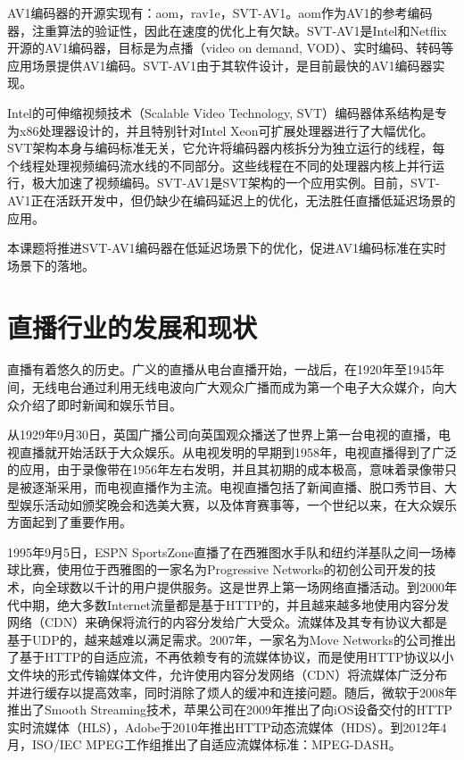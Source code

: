 AV1编码器的开源实现有：aom\cite{AV1SourceCode2020}，rav1e\cite{barbatoRustAV1Encoder2019}，SVT-AV1\cite{ScalableVideoTechnology2020}。aom作为AV1的参考编码器，注重算法的验证性，因此在速度的优化上有欠缺。SVT-AV1是Intel和Netflix开源的AV1编码器，目标是为点播（video on demand, VOD）、实时编码、转码等应用场景提供AV1编码。SVT-AV1由于其软件设计，是目前最快的AV1编码器实现。

Intel的可伸缩视频技术（Scalable Video Technology, SVT）\cite{ScalableVideoTechnology2019}编码器体系结构是专为x86处理器设计的，并且特别针对Intel Xeon可扩展处理器进行了大幅优化。SVT架构本身与编码标准无关，它允许将编码器内核拆分为独立运行的线程，每个线程处理视频编码流水线的不同部分。这些线程在不同的处理器内核上并行运行，极大加速了视频编码。SVT-AV1是SVT架构的一个应用实例。目前，SVT-AV1正在活跃开发中，但仍缺少在编码延迟上的优化，无法胜任直播低延迟场景的应用。

本课题将推进SVT-AV1编码器在低延迟场景下的优化，促进AV1编码标准在实时场景下的落地。

\section{直播行业的发展和现状}

直播有着悠久的历史。广义的直播从电台直播开始，一战后，在1920年至1945年间，无线电台通过利用无线电波向广大观众广播而成为第一个电子大众媒介，向大众介绍了即时新闻和娱乐节目。

从1929年9月30日，英国广播公司向英国观众播送了世界上第一台电视的直播，电视直播就开始活跃于大众娱乐。从电视发明的早期到1958年，电视直播得到了广泛的应用，由于录像带在1956年左右发明，并且其初期的成本极高，意味着录像带只是被逐渐采用，而电视直播作为主流。电视直播包括了新闻直播、脱口秀节目、大型娱乐活动如颁奖晚会和选美大赛，以及体育赛事等，一个世纪以来，在大众娱乐方面起到了重要作用。

1995年9月5日，ESPN SportsZone直播了在西雅图水手队和纽约洋基队之间一场棒球比赛，使用位于西雅图的一家名为Progressive Networks的初创公司开发的技术，向全球数以千计的用户提供服务。这是世界上第一场网络直播活动。到2000年代中期，绝大多数Internet流量都是基于HTTP的，并且越来越多地使用内容分发网络（CDN）来确保将流行的内容分发给广大受众。流媒体及其专有协议大都是基于UDP的，越来越难以满足需求。2007年，一家名为Move Networks的公司推出了基于HTTP的自适应流，不再依赖专有的流媒体协议，而是使用HTTP协议以小文件块的形式传输媒体文件，允许使用内容分发网络（CDN）将流媒体广泛分布并进行缓存以提高效率，同时消除了烦人的缓冲和连接问题。随后，微软于2008年推出了Smooth Streaming技术，苹果公司在2009年推出了向iOS设备交付的HTTP实时流媒体（HLS），Adobe于2010年推出HTTP动态流媒体（HDS）。到2012年4月，ISO/IEC MPEG工作组推出了自适应流媒体标准：MPEG-DASH。

